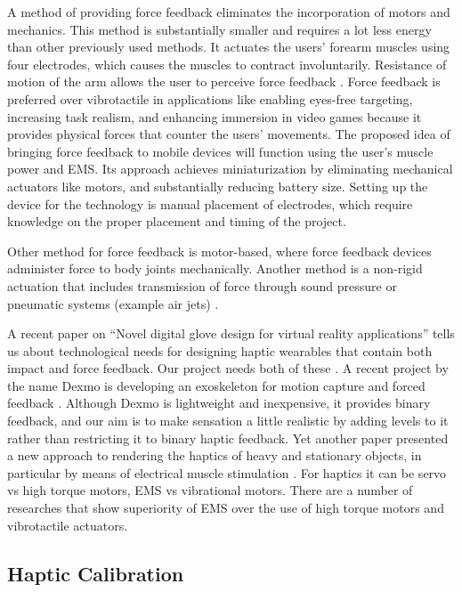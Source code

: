 A method of providing force feedback eliminates the incorporation of motors and mechanics. This method is substantially smaller and requires a lot less energy than other previously used methods. It actuates the users’ forearm muscles using four electrodes, which causes the muscles to contract involuntarily. Resistance of motion of the arm allows the user to perceive force feedback \cite{muscleForceFeedback}. Force feedback is preferred over vibrotactile in applications like enabling eyes-free targeting, increasing task realism, and enhancing immersion in video games because it provides physical forces that counter the users’ movements. The proposed idea of bringing force feedback to mobile devices will function using the user’s muscle power and EMS. Its approach achieves miniaturization by eliminating mechanical actuators like motors, and substantially reducing battery size. Setting up the device for the technology is manual placement of electrodes, which require knowledge on the proper placement and timing of the project. 


Other method for force feedback is motor-based, where force feedback devices administer force to body joints mechanically. Another method is a non-rigid actuation that includes transmission of force through sound pressure or pneumatic systems (example air jets) \cite{muscleForceFeedback}.

A recent paper on “Novel digital glove design for virtual reality applications” tells us about technological needs for designing haptic wearables that contain both impact and force feedback. Our project needs both of these \cite{NovelGlo}. A recent project by the name Dexmo is developing an exoskeleton for motion capture and forced feedback \cite{Dexmo}. Although Dexmo is lightweight and inexpensive, it provides binary feedback, and our aim is to make sensation a little realistic by adding levels to it rather than restricting it to binary haptic feedback. Yet another paper presented a new approach to rendering the haptics of heavy and stationary objects, in particular by means of electrical muscle stimulation \cite{EMSLopes}. For haptics it can be servo vs high torque motors, EMS vs vibrational motors. There are a number of researches that show superiority of EMS over the use of high torque motors and vibrotactile actuators. 

\subsection{Haptic Calibration}

